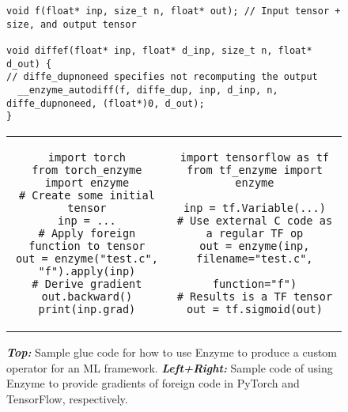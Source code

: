 \begin{figure}
    \centering
    \begin{verbatim}
void f(float* inp, size_t n, float* out); // Input tensor + size, and output tensor

void diffef(float* inp, float* d_inp, size_t n, float* d_out) {
// diffe_dupnoneed specifies not recomputing the output
  __enzyme_autodiff(f, diffe_dup, inp, d_inp, n, diffe_dupnoneed, (float*)0, d_out);
}
\end{verbatim}
\begin{tabular}{c|c}
\begin{minipage}[T]{0.46\linewidth}
\begin{verbatim}
import torch
from torch_enzyme import enzyme
# Create some initial tensor
inp = ...
# Apply foreign function to tensor
out = enzyme("test.c", "f").apply(inp)
# Derive gradient
out.backward()
print(inp.grad)
\end{verbatim}
\end{minipage}& \begin{minipage}[T]{0.53\linewidth}
\begin{verbatim}
import tensorflow as tf
from tf_enzyme import enzyme

inp = tf.Variable(...)
# Use external C code as a regular TF op
out = enzyme(inp, filename="test.c",
                  function="f")
# Results is a TF tensor
out = tf.sigmoid(out)
\end{verbatim}
\end{minipage}
\end{tabular}
    \caption{\textbf{\textit{Top:}} Sample glue code for how to use Enzyme to produce a custom operator for an ML framework. \textbf{\textit{Left+Right:}}
    Sample code of using Enzyme to provide gradients of foreign code in PyTorch and TensorFlow, respectively.}
    \label{fig:mlframeworks}
\end{figure}